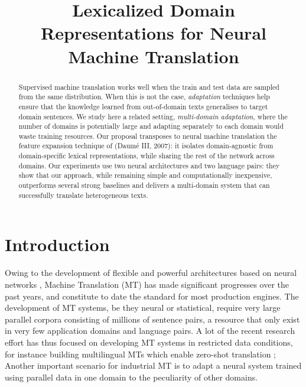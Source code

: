 \documentclass[a4paper]{article}
\title{Lexicalized Domain Representations for Neural Machine Translation}
\begin{document}
\maketitle
%
\begin{abstract}
  Supervised machine translation works well when the train and test data are sampled from the same distribution.
  When this is not the case, \emph{adaptation} techniques help ensure that the knowledge learned from out-of-domain texts generalises to target domain sentences.
  We study here a related setting, \emph{multi-domain adaptation}, where the number of domains is potentially large and adapting separately to each domain would waste training resources.
  Our proposal transposes to neural machine translation the feature expansion technique of (Daum\'e III, 2007): it isolates domain-agnostic from domain-specific lexical representations, while sharing the rest of the network across domains.
  Our experiments use two neural architectures and two language pairs: they show that our approach, while remaining simple and computationally inexpensive, outperforms several strong baselines and delivers a multi-domain system that can successfully translate heterogeneous texts.
\end{abstract}

\section{Introduction \label{sec:introduction}}
Owing to the development of flexible and powerful architectures based on neural networks \cite{Cho14properties,Bahdanau15learning,Ghering17convolutional,Vaswani17attention}, 
Machine Translation (MT) has made significant progresses over the past years, and constitute to date the standard for most production engines. 
The development of MT systems, be they neural or statistical, require very large parallel corpora consisting of millions of sentence pairs, a resource that only exist in very few application domains and language pairs. 
A lot of the recent research effort has thus focused on developing MT systems in restricted data conditions, for instance building multilingual MTs which enable zero-shot translation \cite{Firat16multiway,Ha16towards,Johnson17google};
Another important scenario for industrial MT is to adapt a neural system trained using parallel data in one domain to the peculiarity of other domains. 
\end{document}
